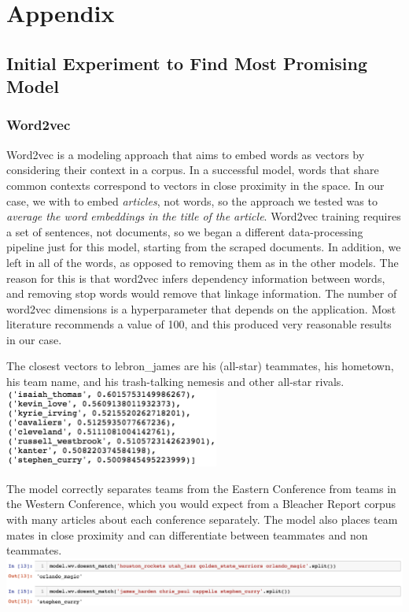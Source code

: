 \documentclass[11pt]{article}
\begin{document}
\section{Appendix}
\subsection{Initial Experiment to Find Most Promising Model}
\subsubsection{Word2vec}
Word2vec is a modeling approach that aims to embed words as vectors by considering their context in a corpus.  In a successful model, words that share common contexts correspond to vectors in close proximity in the space.  In our case, we with to embed \textit{articles}, not words,  so the approach we tested was to \textit{average the word embeddings in the title of the article}. 
Word2vec training requires a set of sentences, not documents, so we began a different data-processing pipeline just for this model, starting from the scraped documents. In addition, we left in all of the words, as opposed to removing them as in the other models. The reason for this is that word2vec infers dependency information between words, and removing stop words would remove that linkage information.
The number of word2vec dimensions is a hyperparameter that depends on the application. Most literature recommends a value of 100, and this produced very reasonable results in our case.

The closest vectors to lebron\_james are his (all-star) teammates, his hometown, his team name, and his trash-talking nemesis and other all-star rivals. \\
\includegraphics[width=200pt]{james_word2vec.png} 

The model correctly separates teams from the Eastern Conference from teams in the Western Conference, which you would expect from a Bleacher Report corpus with many articles about each conference separately. The model also places team mates in close proximity and can differentiate between teammates and non teammates. \\
\includegraphics[width=450pt]{word2vec_diffs.png} 
\end{document}
